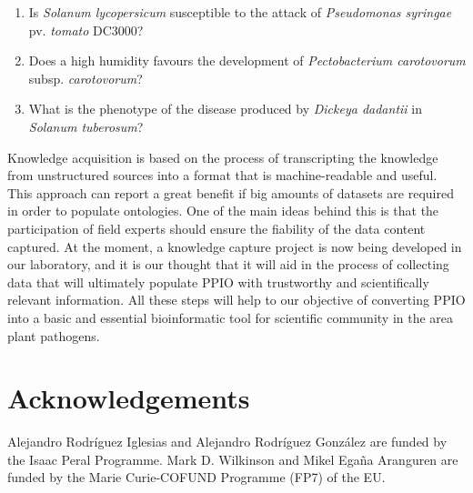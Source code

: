 \documentclass[sw]{iosart2c}
\begin{document}
\begin{enumerate}
\item Is {\itshape Solanum lycopersicum} susceptible to the attack of {\itshape Pseudomonas syringae} pv. {\itshape tomato} DC3000?
\item Does a high humidity favours the development of {\itshape Pectobacterium carotovorum} subsp. {\itshape carotovorum}?
\item What is the phenotype of the disease produced by {\itshape Dickeya dadantii} in {\itshape Solanum tuberosum}?

\end{enumerate}

Knowledge acquisition is based on the process of transcripting the knowledge from unstructured sources into a format that is machine-readable and useful. This approach can report a great benefit if big amounts of datasets are required in order to populate ontologies. One of the main ideas behind this is that the participation of field experts should ensure the fiability of the data content captured. At the moment, a knowledge capture project is now being developed in our laboratory, and it is our thought that it will aid in the process of collecting data that will ultimately populate PPIO with trustworthy and scientifically relevant information. All these steps will help to our objective of converting PPIO into a basic and essential bioinformatic tool for scientific community in the area plant pathogens.

\section*{Acknowledgements}
Alejandro Rodr\'iguez Iglesias and Alejandro Rodr\'iguez Gonz\'alez are funded by the Isaac Peral Programme. Mark D. Wilkinson and Mikel Ega\~na Aranguren are funded by the Marie Curie-COFUND Programme (FP7) of the EU.











  
\end{document}
